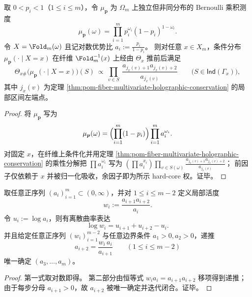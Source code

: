 



\begin{corollary}\label{cor:pom-fiber-inhom-bernoulli-posterior-hardcore}
取 \(0<p_i<1\)（\(1\le i\le m\)），令 \(\mu_{\boldsymbol p}\) 为 \(\Omega_m\) 上独立但非同分布的 Bernoulli 乘积测度
\[
\mu_{\boldsymbol p}(\omega)=\prod_{i=1}^{m}p_i^{\omega_i}(1-p_i)^{1-\omega_i}.
\]
令 \(X=\Fold_m(\omega)\) 且记对数优势比 \(a_i:=\frac{p_i}{1-p_i}\)。
则对任意 \(x\in X_m\)，条件分布 \(\mu_{\boldsymbol p}(\cdot\mid X=x)\) 在纤维 \(\Fold_m^{-1}(x)\) 上经由 \(\Theta_x\) 推前后满足
\[
\Theta_{x\#}\bigl(\mu_{\boldsymbol p}(\cdot\mid X=x)\bigr)(S)
\ \propto\
\prod_{v\in S}\ \frac{a_{j_x(v)+1}a_{j_x(v)+2}}{a_{j_x(v)}}
\qquad\bigl(S\in\mathsf{Ind}(\Gamma_x)\bigr),
\]
其中 \(j_x(v)\) 为定理 \ref{thm:pom-fiber-multivariate-holographic-conservation} 的局部区间左端点。
\end{corollary}

\begin{proof}
将 \(\mu_{\boldsymbol p}\) 写为
\[
\mu_{\boldsymbol p}(\omega)=\Bigl(\prod_{i=1}^{m}(1-p_i)\Bigr)\prod_{i=1}^{m}a_i^{\omega_i}.
\]
对固定 \(x\)，在纤维上条件化并用定理 \ref{thm:pom-fiber-multivariate-holographic-conservation} 的乘性分解把 \(\prod a_i^{\omega_i}\) 写为
\(
(\prod a_i^{x_i})\prod_{v\in S(\omega)}\frac{a_{j_x(v)+1}a_{j_x(v)+2}}{a_{j_x(v)}}
\)；
前因子仅依赖于 \(x\) 并被归一化吸收，余因子即为所示 hard-core 权。证毕。
\end{proof}

\begin{proposition}[局部活度场的离散可积性与两点可识别]\label{prop:pom-inhom-logit-activity-identifiability}
取任意正序列 \((a_i)_{i=1}^{m}\subset(0,\infty)\)，并对 \(1\le i\le m-2\) 定义局部活度
\[
w_i:=\frac{a_{i+1}a_{i+2}}{a_i}.
\]
令 \(u_i:=\log a_i\)，则有离散曲率表达
\[
\log w_i=u_{i+1}+u_{i+2}-u_i.
\]
并且给定任意正序列 \((w_i)_{i=1}^{m-2}\) 与任意边界条件 \(a_1>0,a_2>0\)，递推
\[
a_{i+2}=\frac{w_i\,a_i}{a_{i+1}}\qquad(1\le i\le m-2)
\]
唯一确定 \((a_3,\dots,a_m)\)。
\end{proposition}

\begin{proof}
第一式取对数即得。
第二部分由恒等式 \(w_i a_i=a_{i+1}a_{i+2}\) 移项得到递推；由于每步分母 \(a_{i+1}>0\)，故 \(a_{i+2}\) 被唯一确定并迭代闭合。证毕。
\end{proof}

